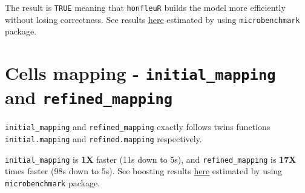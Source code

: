 \documentclass[]{article}
\begin{document}
The result is \texttt{TRUE} meaning that \texttt{honfleuR} builds the
model more efficiently without losing correctness. See results
\href{https://github.com/Puriney/honfleuR/wiki/Performance-enhancements-for-bimodal-distributions-estimation}{here}
estimated by using \texttt{microbenchmark} package.

\section{\texorpdfstring{Cells mapping - \texttt{initial\_mapping} and
\texttt{refined\_mapping}}{Cells mapping - initial\_mapping and refined\_mapping}}\label{cells-mapping---initialux5fmapping-and-refinedux5fmapping}

\texttt{initial\_mapping} and \texttt{refined\_mapping} exactly follows
twins functions \texttt{initial.mapping} and \texttt{refined.mapping}
respectively.

\texttt{initial\_mapping} is \textbf{1X} faster (11s down to 5s), and
\texttt{refined\_mapping} is \textbf{17X} times faster (98s down to 5s).
See boosting results
\href{https://github.com/Puriney/honfleuR/wiki/Performance-enhancements-for-mapping-cells-location-part}{here}
estimated by using \texttt{microbenchmark} package.
\end{document}
